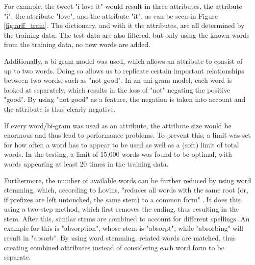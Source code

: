 For example, the tweet "i love it" would result in three attributes, the attribute "i", the attribute "love", and the attribute "it", as can be seen in Figure \ref{fig:arff_train}. The dictionary, and with it the attributes, are all determined by the training data. The test data are also filtered, but only using the known words from the training data, no new words are added. 


Additionally, a bi-gram model was used, which allows an attribute to consist of up to two words. Doing so allows us to replicate certain important relationships between two words, such as "not good". In an uni-gram model, each word is looked at separately, which results in the loss of "not" negating the positive "good". By using "not good" as a feature, the negation is taken into account and the attribute is thus clearly negative.

If every word/bi-gram was used as an attribute, the attribute size would be enormous and thus lead to performance problems. To prevent this, a limit was set for how often a word has to appear to be used as well as a (soft) limit of total words. In the testing, a limit of 15,000 words was found to be optimal, with words appearing at least 20 times in the training data.

Furthermore, the number of available words can be further reduced by using word stemming, which, according to Lovins, "reduces all words with the same root (or, if prefixes are left untouched, the same stem) to a common form" \cite[p.~22]{Lovins1968DevelopmentOA}. It does this using a two-step method, which first removes the ending, thus resulting in the stem. After this, similar stems are combined to account for different spellings. An example for this is "absorption", whose stem is "absorpt", while "absorbing" will result in "absorb". By using word stemming, related words are matched, thus creating combined attributes instead of considering each word form to be separate.

